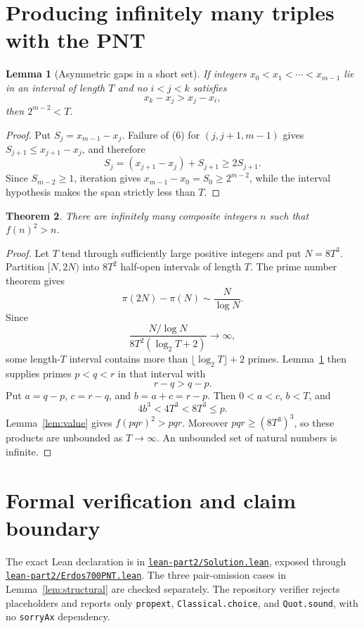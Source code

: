 \documentclass[11pt]{article}
\newtheorem{theorem}{Theorem}
\newtheorem{lemma}[theorem]{Lemma}
\begin{document}
\section{Producing infinitely many triples with the PNT}

\begin{lemma}[Asymmetric gaps in a short set]\label{lem:gaps}
If integers
$x_0<x_1<\cdots<x_{m-1}$ lie in an interval of length $T$ and no
$i<j<k$ satisfies
\[
 x_k-x_j>x_j-x_i,                                          \tag{6}
\]
then $2^{m-2}<T$.
\end{lemma}

\begin{proof}
Put $S_j=x_{m-1}-x_j$.  Failure of (6) for $(j,j+1,m-1)$ gives
$S_{j+1}\leq x_{j+1}-x_j$, and therefore
\[
 S_j=(x_{j+1}-x_j)+S_{j+1}\geq2S_{j+1}.
\]
Since $S_{m-2}\geq1$, iteration gives
$x_{m-1}-x_0=S_0\geq2^{m-2}$, while the interval hypothesis makes the span
strictly less than $T$.
\end{proof}

\begin{theorem}\label{thm:main}
There are infinitely many composite integers $n$ such that $f(n)^2>n$.
\end{theorem}

\begin{proof}
Let $T$ tend through sufficiently large positive integers and put
$N=8T^3$.  Partition $[N,2N)$ into $8T^2$ half-open intervals of length
$T$.  The prime number theorem gives
\[
 \pi(2N)-\pi(N)\sim\frac{N}{\log N}.
\]
Since
\[
 \frac{N/\log N}{8T^2(\log_2T+2)}\longrightarrow\infty,
\]
some length-$T$ interval contains more than
$\lfloor\log_2T\rfloor+2$ primes.  Lemma~\ref{lem:gaps} then supplies
primes $p<q<r$ in that interval with
\[
 r-q>q-p.
\]
Put $a=q-p$, $c=r-q$, and $b=a+c=r-p$.  Then $0<a<c$, $b<T$, and
\[
 4b^3<4T^3<8T^3\leq p.
\]
Lemma~\ref{lem:value} gives $f(pqr)^2>pqr$.  Moreover $pqr\geq(8T^3)^3$,
so these products are unbounded as $T\to\infty$.  An unbounded set of
natural numbers is infinite.
\end{proof}

\section{Formal verification and claim boundary}

The exact Lean declaration is
 in
\href{https://github.com/gakonst/nanocodex-erdos700/blob/main/lean-part2/Solution.lean}
{\texttt{lean-part2/Solution.lean}}, exposed through
\href{https://github.com/gakonst/nanocodex-erdos700/blob/main/lean-part2/Erdos700PNT.lean}
{\texttt{lean-part2/Erdos700PNT.lean}}.  The three pair-omission cases in
Lemma~\ref{lem:structural} are checked separately.  The repository verifier
rejects placeholders and reports only \texttt{propext},
\texttt{Classical.choice}, and \texttt{Quot.sound}, with no
\texttt{sorryAx} dependency.
\end{document}
